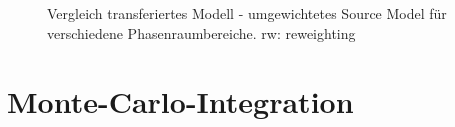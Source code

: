\begin{figure}[h]
	\caption{Vergleich transferiertes Modell - umgewichtetes Source Model für verschiedene Phasenraumbereiche. rw: reweighting}
	\label{Vgl-transfer-rw}
\end{figure}
\section{Monte-Carlo-Integration}
